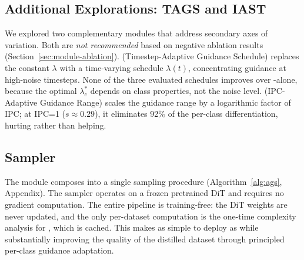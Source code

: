 \subsection{Additional Explorations: TAGS and IAST}
\label{sec:tags-iast}

We explored two complementary modules that address secondary axes of variation. Both are \emph{not recommended} based on negative ablation results (Section~\ref{sec:module-ablation}). \tags{} (Timestep-Adaptive Guidance Schedule) replaces the constant $\lambda$ with a time-varying schedule $\lambda(t)$, concentrating guidance at high-noise timesteps. None of the three evaluated schedules improves over \cags{}-alone, because the optimal $\lambda_c^*$ depends on class properties, not the noise level. \iast{} (IPC-Adaptive Guidance Range) scales the guidance range by a logarithmic factor of IPC; at IPC=1 ($s \approx 0.29$), it eliminates 92\% of the per-class differentiation, hurting rather than helping.

\subsection{\ags{} Sampler}
\label{sec:unified}

The \cags{} module composes into a single sampling procedure (Algorithm~\ref{alg:ags}, Appendix). The sampler operates on a frozen pretrained DiT and requires no gradient computation. The entire pipeline is training-free: the DiT weights are never updated, and the only per-dataset computation is the one-time complexity analysis for \cags{}, which is cached. This makes \ags{} as simple to deploy as \mgd{} while substantially improving the quality of the distilled dataset through principled per-class guidance adaptation.
